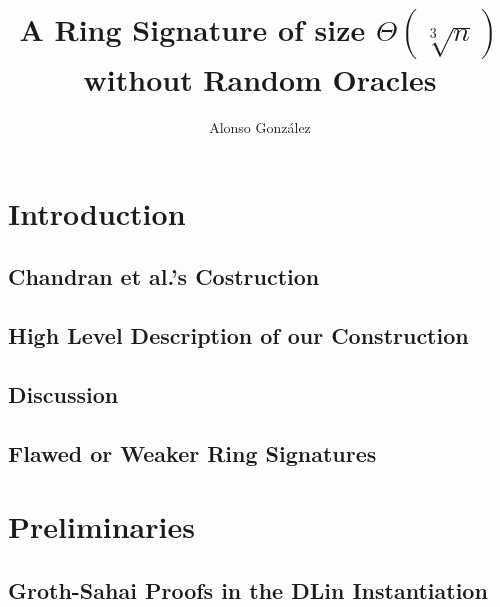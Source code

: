 \documentclass{llncs}
\author{Alonso Gonz\'alez}
\institute
{
	Ecole Normale Sup´\'erieure de Lyon, Laboratoire LIP (France)\\
	\email{alonso.gonzalez@ens-lyon.fr}
}
\title{A Ring Signature of size $\Theta(\sqrt[3]{n})$ without Random Oracles}
\begin{document}
\maketitle
\begin{abstract}
    
\end{abstract} 

\section{Introduction}
    
    
    \subsection{Chandran et al.'s Costruction}
	
          
    
    \subsection{High Level Description of our Construction}
        
        

    \subsection{Discussion}

    	
    
    \subsection{Flawed or Weaker Ring Signatures}\label{sec:rs-flawed}
    
         



\section{Preliminaries}

	
        
	\subsection{Groth-Sahai Proofs in the DLin Instantiation} \label{sec:gs-proofs}
        
            
\end{document}
